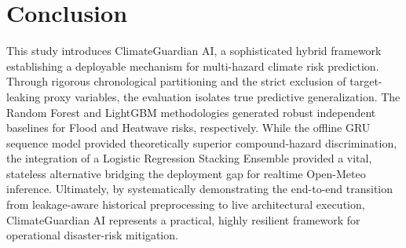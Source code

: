 \section{Conclusion}
\label{sec:conclusion}
This study introduces ClimateGuardian AI, a sophisticated hybrid framework establishing a deployable mechanism for multi-hazard climate risk prediction. Through rigorous chronological partitioning and the strict exclusion of target-leaking proxy variables, the evaluation isolates true predictive generalization. The Random Forest and LightGBM methodologies generated robust independent baselines for Flood and Heatwave risks, respectively. While the offline GRU sequence model provided theoretically superior compound-hazard discrimination, the integration of a Logistic Regression Stacking Ensemble provided a vital, stateless alternative bridging the deployment gap for realtime Open-Meteo inference. Ultimately, by systematically demonstrating the end-to-end transition from leakage-aware historical preprocessing to live architectural execution, ClimateGuardian AI represents a practical, highly resilient framework for operational disaster-risk mitigation.

